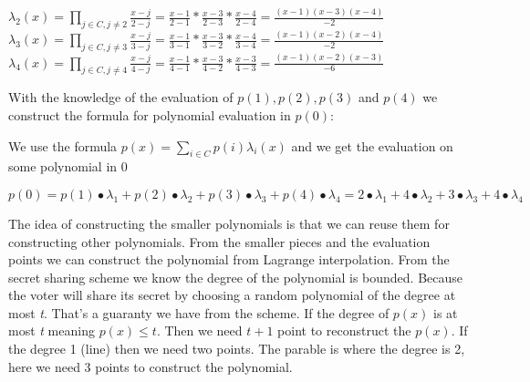 \begin{center}
\begin{math} \lambda_2(x)=\prod\limits_{j\in C,j\neq2} \frac{x-j}{2-j} = \frac{x-1}{2-1}*\frac{x-3}{2-3}*\frac{x-4}{2-4}=\frac{(x-1)(x-3)(x-4)}{-2} \end{math}\\ \begin{math} \lambda_3(x)=\prod\limits_{j\in C,j\neq3} \frac{x-j}{3-j} = \frac{x-1}{3-1}*\frac{x-3}{3-2}*\frac{x-4}{3-4}=\frac{(x-1)(x-2)(x-4)}{-2} \end{math}\\ \begin{math} \lambda_4(x)=\prod\limits_{j\in C,j\neq4} \frac{x-j}{4-j} = \frac{x-1}{4-1}*\frac{x-3}{4-2}*\frac{x-3}{4-3}=\frac{(x-1)(x-2)(x-3)}{-6} \end{math}\\ \end{center}

\noindent
With the knowledge of the evaluation of \begin{math}p(1), p(2), p(3)\end{math} and  \begin{math}p(4)\end{math} we construct the formula for polynomial evaluation in \begin{math}p(0)\end{math}:


\noindent
\begin{infobox}
We use the formula \begin{math}p(x)=\sum\limits_{i \in C} p(i)\lambda_i(x)\end{math} and we get the evaluation on some polynomial in $0$
\begin{center}
\begin{math}p(0)=p(1)∙\lambda_1+p(2)∙\lambda_2+p(3)∙\lambda_3+p(4)∙\lambda_4=2∙\lambda_1+4∙\lambda_2+3∙\lambda_3+4∙\lambda_4 \end{math}
\end{center}
\label{info:Applying_Lagrange_polynomial_interpolation}
\end{infobox}



\noindent
The idea of constructing the smaller polynomials is that we can reuse them for constructing other polynomials. From the smaller pieces and the evaluation points we can construct the polynomial from Lagrange interpolation. From the secret sharing scheme we know the degree of the polynomial is bounded. Because the voter will share its secret by choosing a random polynomial of the degree at most \textit{t}. That’s a guaranty we have from the scheme. If the degree of $p(x)$ is at most \textit{t} meaning $p(x)\leq t$. Then we need $t+1$ point to reconstruct the $p(x)$. If the degree 1 (line) then we need two points. The parable is where the degree is 2, here we need 3 points to construct
the polynomial.

